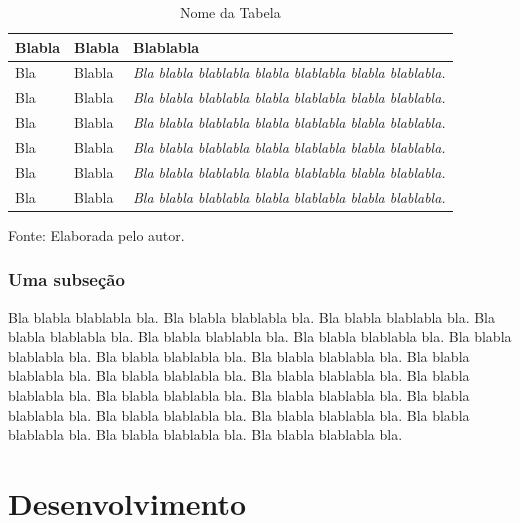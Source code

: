 \documentclass[diss,capa]{texufpel}
\begin{document}
\begin{table}
  \begin{center}
    \caption{Nome da Tabela}\label{tabela}
    \begin{tabular}{p{4cm}p{5cm}p{6cm}}
      \hline
      Blabla & Blabla & Blablabla\\
      \hline
      {\small Bla} & {\small Blabla} & {\small\em Bla blabla blablabla blabla
        blablabla blabla blablabla.}\\
      {\small Bla} & {\small Blabla} & {\small\em Bla blabla blablabla blabla
        blablabla blabla blablabla.}\\
      {\small Bla} & {\small Blabla} & {\small\em Bla blabla blablabla blabla
        blablabla blabla blablabla.}\\
      {\small Bla} & {\small Blabla} & {\small\em Bla blabla blablabla blabla
        blablabla blabla blablabla.}\\
      {\small Bla} & {\small Blabla} & {\small\em Bla blabla blablabla blabla
        blablabla blabla blablabla.}\\
      {\small Bla} & {\small Blabla} & {\small\em Bla blabla blablabla blabla
        blablabla blabla blablabla.}\\
      \hline
    \end{tabular}
    \begin{flushleft}
{\small Fonte: Elaborada pelo autor.}    
\end{flushleft}
  \end{center}
\end{table}

\subsection{Uma subseção}

Bla blabla blablabla bla.  Bla blabla blablabla bla.  Bla blabla
blablabla bla.  Bla blabla blablabla bla.  Bla blabla blablabla bla.
Bla blabla blablabla bla.  Bla blabla blablabla bla.  Bla blabla
blablabla bla.  Bla blabla blablabla bla.  Bla blabla blablabla bla.
Bla blabla blablabla bla.  Bla blabla blablabla bla.  Bla blabla
blablabla bla.  Bla blabla blablabla bla.  Bla blabla blablabla bla.
Bla blabla blablabla bla.  Bla blabla blablabla bla.  Bla blabla
blablabla bla.  Bla blabla blablabla bla.  Bla blabla blablabla bla.
Bla blabla blablabla bla.

\chapter{Desenvolvimento}
\end{document}
